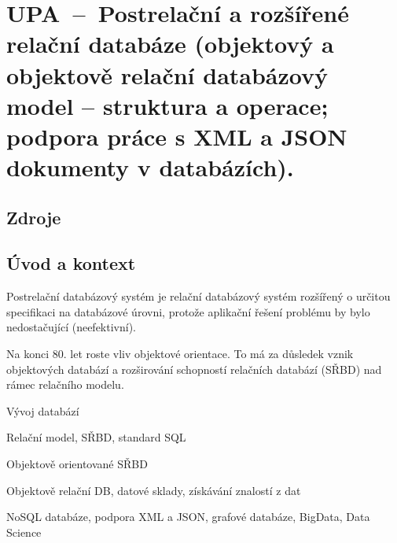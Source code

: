 

\graphicspath{{upa/postrelacni_a_rozsirene_relacni/figures}}


\chapter{UPA~--~Postrelační a rozšířené relační databáze (objektový a objektově relační databázový model -- struktura a operace; podpora práce s XML a JSON dokumenty v databázích).}


\section{Zdroje}

\begin{compactitem}
    \item {}
    \item {}
\end{compactitem}


\section{Úvod a kontext}

\begin{compactitem}
    \item Postrelační databázový systém je relační databázový systém rozšířený o určitou specifikaci na databázové úrovni, protože aplikační řešení problému by bylo nedostačující (neefektivní). \begin{compactitem}
        \item Na konci 80. let roste vliv objektové orientace. To má za důsledek vznik objektových databází a rozširování schopností relačních databází (SŘBD) nad rámec relačního modelu.
    \end{compactitem}
    \item Vývoj databází
    \item Relační model, SŘBD, standard SQL
    \item Objektově orientované SŘBD
    \item Objektově relační DB, datové sklady, získávání znalostí z dat
    \item NoSQL databáze, podpora XML a JSON, grafové databáze, BigData, Data Science
\end{compactitem}

